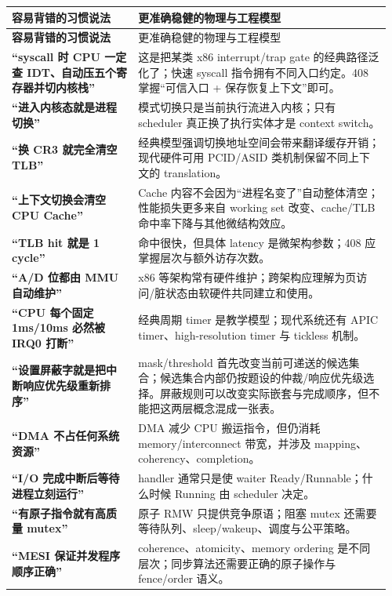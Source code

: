 \documentclass[11pt,a4paper]{ctexart}
\begin{document}
\begingroup
\small
\renewcommand{\arraystretch}{1.25}
\begin{longtable}{>{\bfseries}p{0.32\linewidth} p{0.64\linewidth}}
\toprule
容易背错的习惯说法 & 更准确稳健的物理与工程模型\\
\midrule
\endfirsthead
\toprule
容易背错的习惯说法 & 更准确稳健的物理与工程模型\\
\midrule
\endhead
“syscall 时 CPU 一定查 IDT、自动压五个寄存器并切内核栈” & 这是把某类 x86 interrupt/trap gate 的经典路径泛化了；快速 syscall 指令拥有不同入口约定。408 掌握“可信入口 + 保存恢复上下文”即可。\\
“进入内核态就是进程切换” & 模式切换只是当前执行流进入内核；只有 scheduler 真正换了执行实体才是 context switch。\\
“换 CR3 就完全清空 TLB” & 经典模型强调切换地址空间会带来翻译缓存开销；现代硬件可用 PCID/ASID 类机制保留不同上下文的 translation。\\
“上下文切换会清空 CPU Cache” & Cache 内容不会因为“进程名变了”自动整体清空；性能损失更多来自 working set 改变、cache/TLB 命中率下降与其他微结构效应。\\
“TLB hit 就是 1 cycle” & 命中很快，但具体 latency 是微架构参数；408 应掌握层次与额外访存次数。\\
“A/D 位都由 MMU 自动维护” & x86 等架构常有硬件维护；跨架构应理解为页访问/脏状态由软硬件共同建立和使用。\\
“CPU 每个固定 1ms/10ms 必然被 IRQ0 打断” & 经典周期 timer 是教学模型；现代系统还有 APIC timer、high-resolution timer 与 tickless 机制。\\
“设置屏蔽字就是把中断响应优先级重新排序” & mask/threshold 首先改变当前可递送的候选集合；候选集合内部仍按题设的仲裁/响应优先级选择。屏蔽规则可以改变实际嵌套与完成顺序，但不能把这两层概念混成一张表。\\
“DMA 不占任何系统资源” & DMA 减少 CPU 搬运指令，但仍消耗 memory/interconnect 带宽，并涉及 mapping、coherency、completion。\\
“I/O 完成中断后等待进程立刻运行” & handler 通常只是使 waiter Ready/Runnable；什么时候 Running 由 scheduler 决定。\\
“有原子指令就有高质量 mutex” & 原子 RMW 只提供竞争原语；阻塞 mutex 还需要等待队列、sleep/wakeup、调度与公平策略。\\
“MESI 保证并发程序顺序正确” & coherence、atomicity、memory ordering 是不同层次；同步算法还需要正确的原子操作与 fence/order 语义。\\
\bottomrule
\end{longtable}
\endgroup
\end{document}
